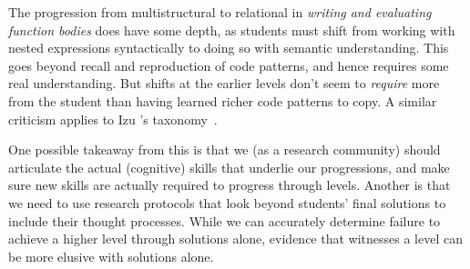 

The progression from multistructural to relational in \emph{writing and evaluating function bodies} does
have some depth, as students must shift from working with nested
expressions syntactically to doing so with semantic
understanding. This goes beyond recall and reproduction of code
patterns, and hence requires some real understanding.  But shifts at
the earlier levels don't seem to \emph{require} more from the student
than having learned richer code patterns to copy.  A similar criticism
applies to Izu \etal's taxonomy~\cite{izu-code-design-solo16}.

One possible takeaway from this is that we (as a research community)
should articulate the actual (cognitive) skills that underlie our progressions,
and make sure new skills are actually required to progress through
levels. Another is that we need to use research protocols that look
beyond students' final solutions to include their thought processes.
While we can accurately determine failure to achieve a higher level
through solutions alone, evidence that witnesses a level can be more
elusive with solutions alone.



